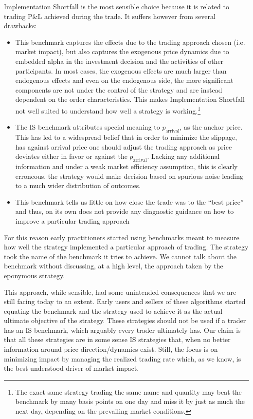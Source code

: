 Implementation Shortfall is the most sensible choice because it is related to trading P\&L achieved during the trade.  It suffers however from several drawbacks:

\begin{itemize}
\item This benchmark captures the effects due to the trading approach chosen (i.e. market impact), but also captures the exogenous price dynamics due to embedded alpha in the investment decision and the activities of other participants. In most cases, the exogenous effects are much larger than endogenous effects and even on the endogenous side, the more significant components are not under the control of the strategy and are instead dependent on the order characteristics. This makes Implementation Shortfall not well suited to understand how well a strategy is working.\footnote{The exact same strategy trading the same name and quantity may beat the benchmark by many basis points on one day and miss it by just as much the next day, depending on the prevailing market conditions.}

\item The IS benchmark attributes special meaning to $p_{\text{arrival}}$, as the anchor price. This has led to a widespread belief that in order to minimize the slippage, has against arrival price one should adjust the trading approach as price deviates either in favor or against the   $p_{\text{arrival}}$. Lacking any additional information and under a weak market efficiency assumption, this is clearly erroneous, the strategy would make decision based on spurious noise leading to a much wider distribution of outcomes.

\item This benchmark tells us little on how close the trade was to the ``best price'' and thus, on its own does not provide any diagnostic guidance on how to improve a particular trading approach
\end{itemize}


For this reason early practitioners started using benchmarks meant to measure how well the strategy implemented a particular approach of trading. The strategy took the name of the benchmark it tries to achieve. We cannot talk about the benchmark without discussing, at a high level, the approach taken by the  eponymous strategy.


This approach, while sensible, had some unintended consequences that we are still facing today to an extent. Early users and sellers of these algorithms started equating the benchmark and the strategy used to achieve it as the actual ultimate objective of the strategy. These strategies should not be used if a trader has an IS benchmark, which arguably every trader ultimately has. Our claim is that all these strategies are in some sense IS strategies that, when no better information around price direction/dynamics exist. Still, the focus is on minimizing impact by managing the realized trading rate which, as we know, is the best understood driver of market impact.



